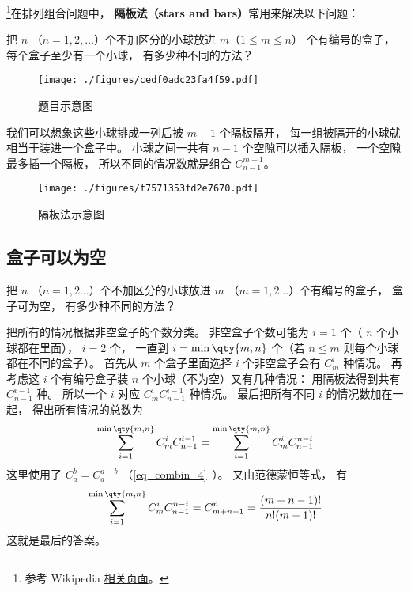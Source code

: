 


\footnote{参考 Wikipedia \href{https://en.wikipedia.org/wiki/Stars_and_bars_(combinatorics)}{相关页面}。}在排列组合问题中， \textbf{隔板法（stars and bars）}常用来解决以下问题：

\begin{example}{}
把 $n$ （$n = 1,2,\dots$）个不加区分的小球放进 $m$（$1\leqslant m\leqslant n$） 个有编号的盒子， 每个盒子至少有一个小球， 有多少种不同的方法？
\begin{figure}[ht]
\centering
\texttt{[image: ./figures/cedf0adc23fa4f59.pdf]}
\caption{题目示意图} \label{fig_BarCom_1}
\end{figure}
\end{example}

我们可以想象这些小球排成一列后被 $m-1$ 个隔板隔开， 每一组被隔开的小球就相当于装进一个盒子中。 小球之间一共有 $n-1$ 个空隙可以插入隔板， 一个空隙最多插一个隔板， 所以不同的情况数就是组合 $C_{n-1}^{m-1}$。
\begin{figure}[ht]
\centering
\texttt{[image: ./figures/f7571353fd2e7670.pdf]}
\caption{隔板法示意图} \label{fig_BarCom_2}
\end{figure}

\subsection{盒子可以为空}


\begin{example}{}
把 $n$ （$n=1,2\dots$）个不加区分的小球放进 $m$ （$m=1,2\dots$）个有编号的盒子， 盒子可为空， 有多少种不同的方法？
\end{example}

把所有的情况根据非空盒子的个数分类。 非空盒子个数可能为 $i=1$ 个（ $n$ 个小球都在里面）， $i=2$ 个， 一直到 $i=\min\qty{m,n}$ 个（若 $n\leqslant m$ 则每个小球都在不同的盒子）。 首先从 $m$ 个盒子里面选择 $i$ 个非空盒子会有 $C_m^i$ 种情况。 再考虑这 $i$ 个有编号盒子装 $n$ 个小球（不为空）又有几种情况： 用隔板法得到共有 $C_{n-1}^{i-1}$ 种。 所以一个 $i$ 对应 $C_m^i C_{n-1}^{i-1}$ 种情况。 最后把所有不同 $i$ 的情况数加在一起， 得出所有情况的总数为
\begin{equation}
\sum_{i = 1}^{\min\qty{m,n}} C_m^i C_{n-1}^{i-1} = \sum_{i=1}^{\min\qty{m,n}}  C_m^i C_{n-1}^{n-i}
\end{equation}
这里使用了 $C_a^b = C_a^{a-b}$ （\autoref{eq_combin_4}~）。 又由范德蒙恒等式， 有
\begin{equation}
\sum_{i=1}^{\min\qty{m,n}}  C_m^i C_{n-1}^{n-i} = C_{m+n-1}^n = \frac{(m+n-1)!}{n!(m - 1)!}
\end{equation}
这就是最后的答案。
